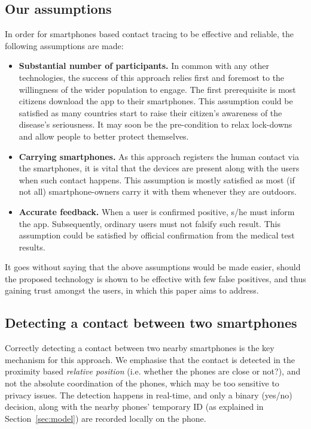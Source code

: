 \documentclass[graybox]{svmult}
\begin{document}
\subsection{Our assumptions}
In order for smartphones based contact tracing to be effective and reliable, the following assumptions are made:
\begin{itemize}
    \item \textbf{Substantial number of participants.} In common with any other technologies, the success of this approach relies first and foremost to the willingness of the wider population to engage. The first prerequisite is most citizens download the app to their smartphones. This assumption could be satisfied as many countries start to raise their citizen's awareness of the disease's seriousness. It may soon be the pre-condition to relax lock-downs and allow people to better protect themselves.
    
    \item \textbf{Carrying smartphones.} As this approach registers the human contact via the smartphones, it is vital that the devices are present along with the users when such contact happens. This assumption is mostly satisfied as most (if not all) smartphone-owners carry it with them whenever they are outdoors.
    
    \item \textbf{Accurate feedback.} When a user is confirmed positive, s/he must inform the app. Subsequently, ordinary users must not falsify such result. This assumption could be satisfied by official confirmation from the medical test results.
\end{itemize}

It goes without saying that the above assumptions would be made easier, should the proposed technology is shown to be effective with few false positives, and thus gaining trust amongst the users, in which this paper aims to address.


\subsection{Detecting a contact between two smartphones}
Correctly detecting a contact between two nearby smartphones is the key mechanism for this approach. We emphasise that the contact is detected in the proximity based \textit{relative position} (i.e. whether the phones are close or not?), and not the absolute coordination of the phones, which may be too sensitive to privacy issues. The detection happens in real-time, and only a binary (yes/no) decision, along with the nearby phones' temporary ID (as explained in Section~\ref{sec:model}) are recorded locally on the phone.
\end{document}
